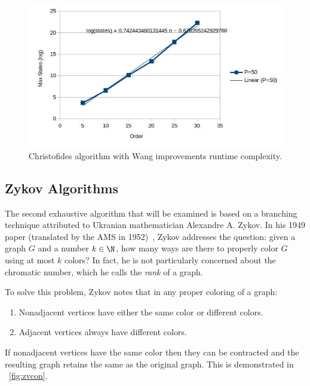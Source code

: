 \begin{figure}[H]
  \centering
  \includegraphics[width=5in]{wang_runtime}
  \caption{Christofides algorithm with Wang improvements runtime complexity.}
  \label{fig:wangruntime}
\end{figure}

\subsection{Zykov Algorithms}\label{sec:sub:zykov}

The second exhaustive algorithm that will be examined is based on a branching technique attributed to Ukranian
mathematician Alexandre A. Zykov.  In his 1949 paper (translated by the AMS in 1952)~\cite{zykov}, Zykov addresses
the question: given a graph \(G\) and a number \(k\in\N\), how many ways are there to properly color \(G\) using at
most \(k\) colors?  In fact, he is not particularly concerned about the chromatic number, which he calls the
\emph{rank} of a graph.

To solve this problem, Zykov notes that in any proper coloring of a graph:
\begin{enumerate}
\item Nonadjacent vertices have either the same color or different colors.
\item Adjacent vertices always have different colors.
\end{enumerate}
If nonadjacent vertices have the same color then they can be contracted and the resulting graph retains the same
 as the original graph.  This is demonstrated in \figurename~\ref{fig:zvcon}.

